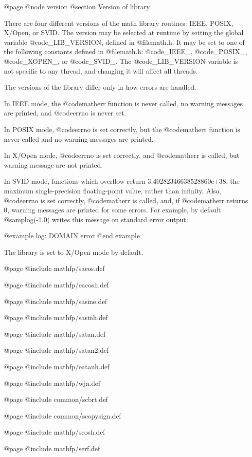 @page
@node version
@section Version of library

There are four different versions of the math library routines: IEEE,
POSIX, X/Open, or SVID.  The version may be selected at runtime by
setting the global variable @code{_LIB_VERSION}, defined in
@file{math.h}.  It may be set to one of the following constants defined
in @file{math.h}: @code{_IEEE_}, @code{_POSIX_}, @code{_XOPEN_}, or
@code{_SVID_}.  The @code{_LIB_VERSION} variable is not specific to any
thread, and changing it will affect all threads.

The versions of the library differ only in how errors are handled.

In IEEE mode, the @code{matherr} function is never called, no warning
messages are printed, and @code{errno} is never set.

In POSIX mode, @code{errno} is set correctly, but the @code{matherr}
function is never called and no warning messages are printed.

In X/Open mode, @code{errno} is set correctly, and @code{matherr} is
called, but warning message are not printed.

In SVID mode, functions which overflow return 3.40282346638528860e+38,
the maximum single-precision floating-point value, rather than infinity.
Also, @code{errno} is set correctly, @code{matherr} is called, and, if
@code{matherr} returns 0, warning messages are printed for some errors.
For example, by default @samp{log(-1.0)} writes this message on standard
error output:

@example
log: DOMAIN error
@end example

The library is set to X/Open mode by default.

@page
@include mathfp/sacos.def

@page
@include mathfp/eacosh.def

@page
@include mathfp/sasine.def

@page
@include mathfp/sasinh.def

@page
@include mathfp/satan.def

@page
@include mathfp/satan2.def

@page
@include mathfp/eatanh.def

@page
@include mathfp/wjn.def

@page
@include common/scbrt.def

@page
@include common/scopysign.def

@page
@include mathfp/scosh.def

@page
@include mathfp/serf.def

